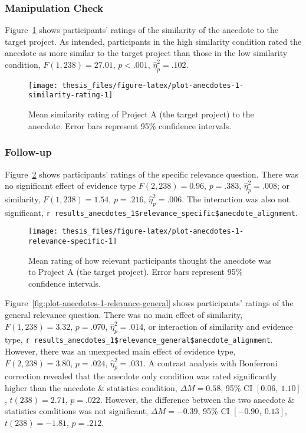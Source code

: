 \documentclass[a4paper, nobind]{templates/ociamthesis}
\theoremstyle{definition}
\theoremstyle{definition}
\theoremstyle{definition}
\theoremstyle{definition}
\theoremstyle{remark}
\begin{document}
\subsubsection{Manipulation Check}

Figure~\ref{fig:plot-anecdotes-1-similarity-rating} shows participants' ratings
of the similarity of the anecdote to the target project. As intended,
participants in the high similarity condition rated the anecdote as more similar
to the target project than those in the low similarity condition,
\(F(1, 238) = 27.01\), \(p < .001\), \(\hat{\eta}^2_p = .102\).



\begin{figure}
\texttt{[image: thesis\_files/figure-latex/plot-anecdotes-1-similarity-rating-1]} \caption{Mean similarity rating of Project A (the target project) to the anecdote. Error bars represent 95\% confidence intervals.}\label{fig:plot-anecdotes-1-similarity-rating}
\end{figure}

\subsubsection{Follow-up}

Figure~\ref{fig:plot-anecdotes-1-relevance-specific} shows participants'
ratings of the specific relevance question. There was no significant effect of
evidence type \(F(2, 238) = 0.96\), \(p = .383\), \(\hat{\eta}^2_p = .008\); or
similarity, \(F(1, 238) = 1.54\), \(p = .216\), \(\hat{\eta}^2_p = .006\). The
interaction was also not significant, \texttt{r\ results\_anecdotes\_1\$relevance\_specific\$anecdote\_alignment}.



\begin{figure}
\texttt{[image: thesis\_files/figure-latex/plot-anecdotes-1-relevance-specific-1]} \caption{Mean rating of how relevant participants thought the anecdote was to Project A (the target project). Error bars represent 95\% confidence intervals.}\label{fig:plot-anecdotes-1-relevance-specific}
\end{figure}

Figure~\ref{fig:plot-anecdotes-1-relevance-general} shows participants' ratings
of the general relevance question. There was no main effect of similarity,
\(F(1, 238) = 3.32\), \(p = .070\), \(\hat{\eta}^2_p = .014\), or interaction of
similarity and evidence type, \texttt{r\ results\_anecdotes\_1\$relevance\_general\$anecdote\_alignment}. However, there was an
unexpected main effect of evidence type,
\(F(2, 238) = 3.80\), \(p = .024\), \(\hat{\eta}^2_p = .031\). A contrast analysis with
Bonferroni correction revealed that the anecdote only condition was rated
significantly higher than the anecdote \& statistics condition,
\(\Delta M = 0.58\), 95\% CI \([0.06,~1.10]\), \(t(238) = 2.71\), \(p = .022\). However, the
difference between the two anecdote \& statistics conditions was not significant,
\(\Delta M = -0.39\), 95\% CI \([-0.90,~0.13]\), \(t(238) = -1.81\), \(p = .212\).
\end{document}
